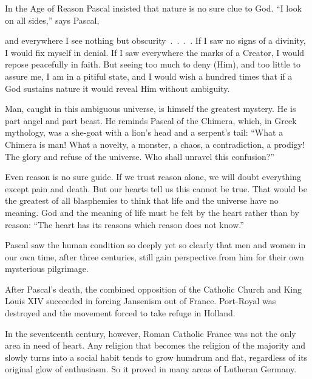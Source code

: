 In the Age of Reason Pascal insisted that nature is no sure clue to God. “I look on all sides,” says
Pascal,

\begin{blockquote}
and everywhere I see nothing but obscurity~.~.~.~. If I saw no signs of a divinity, I would fix
myself in denial. If I saw everywhere the marks of a Creator, I would repose peacefully in faith.
But seeing too much to deny (Him), and too little to assure me, I am in a pitiful state, and I would
wish a hundred times that if a God sustains nature it would reveal Him without ambiguity.
\end{blockquote}

Man, caught in this ambiguous universe, is himself the greatest mystery. He is part angel and part
beast. He reminds Pascal of the Chimera, which, in Greek mythology, was a she-goat with a lion’s
head and a serpent’s tail: “What a Chimera is man! What a novelty, a monster, a chaos, a
contradiction, a prodigy! The glory and refuse of the universe. Who shall unravel this confusion?”

Even reason is no sure guide. If we trust reason alone, we will doubt everything except pain and
death. But our hearts tell us this cannot be true. That would be the greatest of all blasphemies to
think that life and the universe have no meaning. God and the meaning of life must be felt by the
heart rather than by reason: “The heart has its reasons which reason does not know.”

Pascal saw the human condition so deeply yet so clearly that men and women in our own time, after
three centuries, still gain perspective from him for their own mysterious pilgrimage.

After Pascal’s death, the combined opposition of the Catholic Church and King Louis XIV succeeded in
forcing Jansenism out of France. Port-Royal was destroyed and the movement forced to take refuge in
Holland.

In the seventeenth century, however, Roman Catholic France was not the only area in need of heart.
Any religion that becomes the religion of the majority and slowly turns into a social habit tends to
grow humdrum and flat, regardless of its original glow of enthusiasm. So it proved in many areas of
Lutheran Germany.

